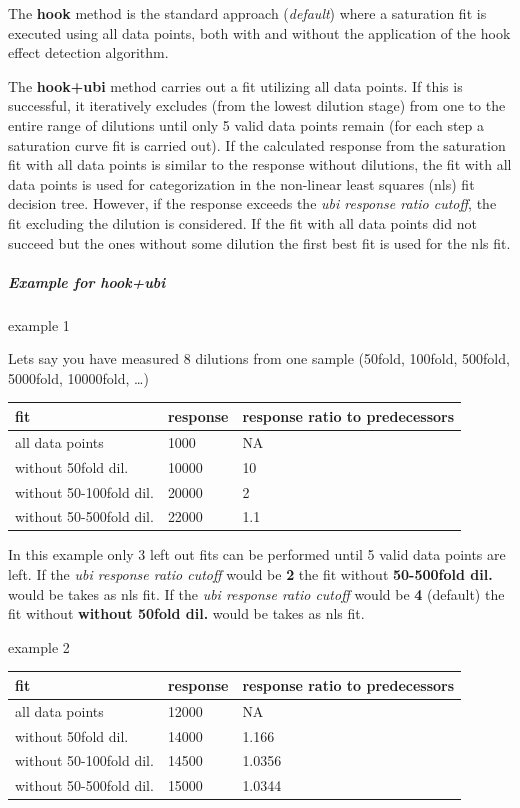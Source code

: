 \documentclass[
]{book}
\begin{document}
The \textbf{hook} method is the standard approach (\emph{default}) where a saturation fit is executed using all data points, both with and without the application of the hook effect detection algorithm.

The \textbf{hook+ubi} method carries out a fit utilizing all data points. If this is successful, it iteratively excludes (from the lowest dilution stage) from one to the entire range of dilutions until only 5 valid data points remain (for each step a saturation curve fit is carried out). If the calculated response from the saturation fit with all data points is similar to the response without dilutions, the fit with all data points is used for categorization in the non-linear least squares (nls) fit decision tree. However, if the response exceeds the \emph{ubi response ratio cutoff}, the fit excluding the dilution is considered.
If the fit with all data points did not succeed but the ones without some dilution the first best fit is used for the nls fit.

\subparagraph{\texorpdfstring{Example for \textbf{hook+ubi}}{Example for hook+ubi}}\label{example-for-hookubi}

example 1

Lets say you have measured 8 dilutions from one sample (50fold, 100fold, 500fold, 5000fold, 10000fold, \ldots)

\begin{longtable}[]{@{}lll@{}}
\toprule\noalign{}
fit & response & response ratio to predecessors \\
\midrule\noalign{}
\endhead
\bottomrule\noalign{}
\endlastfoot
all data points & 1000 & NA \\
without 50fold dil. & 10000 & 10 \\
without 50-100fold dil. & 20000 & 2 \\
without 50-500fold dil. & 22000 & 1.1 \\
\end{longtable}

In this example only 3 left out fits can be performed until 5 valid data points are left.
If the \emph{ubi response ratio cutoff} would be \textbf{2} the fit without \textbf{50-500fold dil.} would be takes as nls fit.
If the \emph{ubi response ratio cutoff} would be \textbf{4} (default) the fit without \textbf{without 50fold dil.} would be takes as nls fit.

example 2

\begin{longtable}[]{@{}lll@{}}
\toprule\noalign{}
fit & response & response ratio to predecessors \\
\midrule\noalign{}
\endhead
\bottomrule\noalign{}
\endlastfoot
all data points & 12000 & NA \\
without 50fold dil. & 14000 & 1.166 \\
without 50-100fold dil. & 14500 & 1.0356 \\
without 50-500fold dil. & 15000 & 1.0344 \\
\end{longtable}
\end{document}
